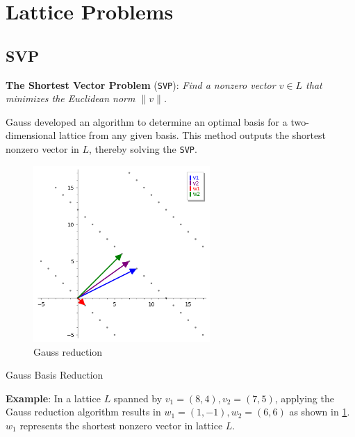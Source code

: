 \documentclass[a4paper,12pt]{report}
\begin{document}
\section{Lattice Problems}

\subsection{SVP}

\textbf{The Shortest Vector Problem} (\texttt{SVP}): \textit{Find a nonzero vector $v \in L$ that minimizes the Euclidean norm $\lVert v \rVert$.}

Gauss developed an algorithm to determine an optimal basis for a two-dimensional lattice from any given basis. This method outputs the shortest nonzero vector in $L$, thereby solving the \texttt{SVP}.

\begin{figure}[!b]
    \centering
    \includegraphics[width=0.6\textwidth]{./img/gauss_svp.png}
    \caption{Gauss reduction}
    \label{fig:gauss_svp}
\end{figure}

\begin{algorithm}[H]
    \vspace*{5px}
    \caption{Gauss Basis Reduction}
\end{algorithm}

\textbf{Example}: In a lattice $L$ spanned by $v_1 = (8, 4), v_2 = (7, 5)$, applying the Gauss reduction algorithm results in $w_1 = (1, -1), w_2 = (6, 6)$ as shown in \ref{fig:gauss_svp}. $w_1$ represents the shortest nonzero vector in lattice $L$.
\end{document}
